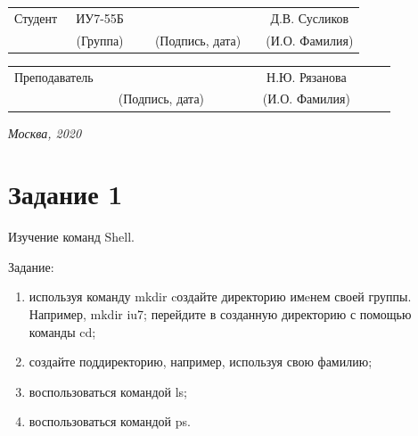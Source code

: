 \documentclass[14pt, a4paper]{extarticle}
\begin{document}
	
	\noindent
	\\
	
	\noindent
	\\
	
	\vspace{1.5cm}
	\noindent
	\begin{tabular}{l c c c c c}
		Студент      & ~ИУ7-55Б~               & \hspace{2.5cm} & \hspace{2cm}                 & &  Д.В. 
		Сусликов \\\cline{2-2}\cline{4-4} \cline{6-6} 
		\hspace{3cm} & {\footnotesize(Группа)} &                & {\footnotesize(Подпись, дата)} & & {\footnotesize(И.О. Фамилия)}
	\end{tabular}
	
	\noindent
	\begin{tabular}{l c c c c}
		Преподаватель & \hspace{5cm}   & \hspace{2cm}                 & & ~~~~~~Н.Ю. Рязанова~~~~~~\\\cline{3-3} \cline{5-5} 
		\hspace{3cm}  &                & {\footnotesize(Подпись, дата)} & & {\footnotesize(И.О. Фамилия)}
	\end{tabular}
	
	\vspace{0.6cm}
	\begin{center}	
		\vfill
		\large \textit {Москва, 2020}
	\end{center}
	
	\thispagestyle {empty}
	\pagebreak
	
	\clearpage
	\tableofcontents
	
	
	\clearpage
	\section{Задание 1}
	Изучение команд Shell.
	
	Задание:
	\begin{enumerate}
		\item используя команду mkdir cоздайте директорию имeнем своей группы. Например, mkdir iu7; перейдите в созданную директорию с помощью команды cd;
		\item создайте поддиректорию, например, используя свою фамилию;
		\item воспользоваться командой ls;
		\item воспользоваться командой ps.	
	\end{enumerate}
	
\end{document}
